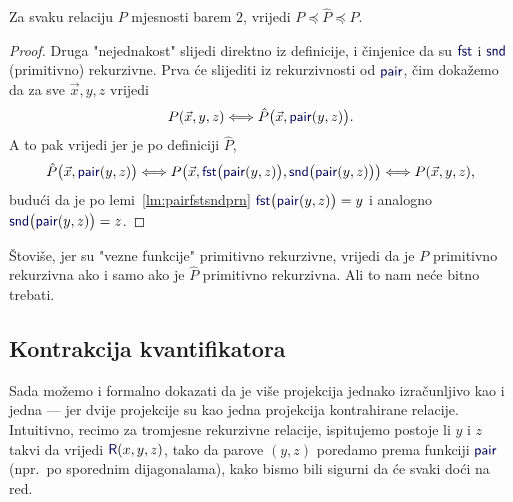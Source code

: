 \begin{lema}[{name=[međusobna svedivost relacije i njene kontrakcije]}]\label{lm:hatPeqP}
Za svaku relaciju $P$ mjesnosti barem $2$, vrijedi $P\preceq\hat P\preceq P$.
\end{lema}
\begin{proof}
Druga "nejednakost" slijedi direktno iz definicije, i činjenice da su $\f{fst}$ i $\f{snd}$ (primitivno) rekurzivne. Prva će slijediti iz rekurzivnosti od $\f{pair}$, čim dokažemo da za sve $\vec x,y,z$ vrijedi
\begin{equation}\label{eq:hatPpair}
    P(\vec x,y,z)\Longleftrightarrow\hat P\bigl(\vec x,\f{pair}(y,z)\bigr)\text.
\end{equation}
A to pak vrijedi jer je po definiciji $\hat P$,
\begin{equation}
    \hat P\bigl(\vec x,\f{pair}(y,z)\bigr)\Longleftrightarrow P\bigl(\vec x,\f{fst}\bigl(\f{pair}(y,z)\bigr),\f{snd}\bigl(\f{pair}(y,z)\bigr)\bigr)\Longleftrightarrow P(\vec x,y,z)\text,
\end{equation}
budući da je po lemi~\ref{lm:pairfstsndprn} $\f{fst}\bigl(\f{pair}(y,z)\bigr)=y$ i analogno $\f{snd}\bigl(\f{pair}(y,z)\bigr)=z$.
\end{proof}

\begin{napomena}[{name=[kontrahiranje čuva i primitivnu rekurzivnost]}]
Štoviše, jer su "vezne funkcije" primitivno rekurzivne, vrijedi da je $P$ primitivno rekurzivna ako i samo ako je $\hat P$ primitivno rekurzivna. Ali to nam neće bitno trebati.
\end{napomena}

\subsection{Kontrakcija kvantifikatora}

Sada možemo i formalno dokazati da je više projekcija jednako izračunljivo kao i jedna --- jer dvije projekcije su kao jedna projekcija kontrahirane relacije. Intuitivno, recimo za tromjesne rekurzivne relacije, ispitujemo postoje li $y$ i $z$ takvi da vrijedi $\f R(x,y,z)$, tako da parove $(y,z)$ poredamo prema funkciji $\f{pair}$ (npr.\ po sporednim dijagonalama), kako bismo bili sigurni da će svaki doći na red.

